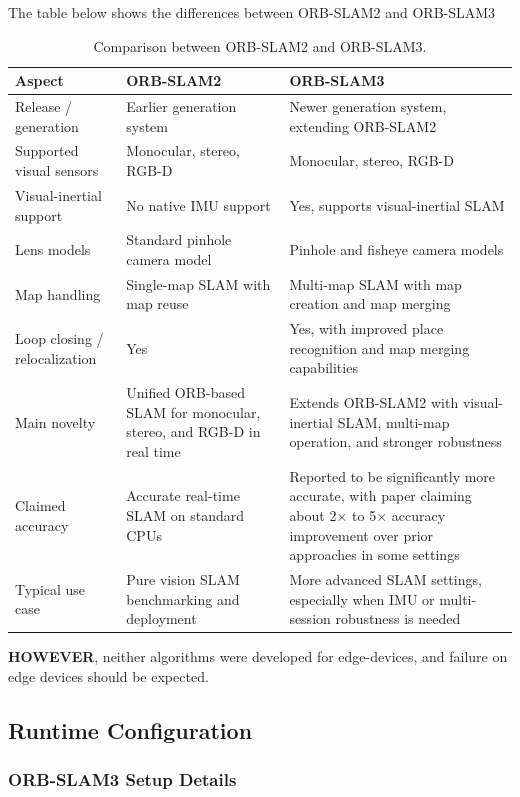 \documentclass[11pt]{article}
\begin{document}
The table below shows the differences between ORB-SLAM2 and ORB-SLAM3
\begin{table}[H]
\centering
\caption{Comparison between ORB-SLAM2 and ORB-SLAM3.}
\label{tab:orbslam2_vs_orbslam3}
\renewcommand{\arraystretch}{1.2}
\setlength{\tabcolsep}{5pt}
\begin{tabular}{p{3.2cm}p{5.2cm}p{5.2cm}}
\toprule
\textbf{Aspect} & \textbf{ORB-SLAM2} & \textbf{ORB-SLAM3} \\
\midrule
Release / generation
& Earlier generation system
& Newer generation system, extending ORB-SLAM2 \\
\midrule
Supported visual sensors
& Monocular, stereo, RGB-D
& Monocular, stereo, RGB-D \\
\midrule
Visual-inertial support
& No native IMU support
& Yes, supports visual-inertial SLAM \\
\midrule
Lens models
& Standard pinhole camera model
& Pinhole and fisheye camera models \\
\midrule
Map handling
& Single-map SLAM with map reuse
& Multi-map SLAM with map creation and map merging \\
\midrule
Loop closing / relocalization
& Yes
& Yes, with improved place recognition and map merging capabilities \\
\midrule
Main novelty
& Unified ORB-based SLAM for monocular, stereo, and RGB-D in real time
& Extends ORB-SLAM2 with visual-inertial SLAM, multi-map operation, and stronger robustness \\
\midrule
Claimed accuracy
& Accurate real-time SLAM on standard CPUs
& Reported to be significantly more accurate, with paper claiming about 2$\times$ to 5$\times$ accuracy improvement over prior approaches in some settings \\
\midrule
Typical use case
& Pure vision SLAM benchmarking and deployment
& More advanced SLAM settings, especially when IMU or multi-session robustness is needed \\
\bottomrule
\end{tabular}
\end{table}

\textbf{HOWEVER}, neither algorithms were developed for edge-devices, and failure on edge devices should be expected.
\subsection{Runtime Configuration}

\subsubsection{ORB-SLAM3 Setup Details}
\end{document}
